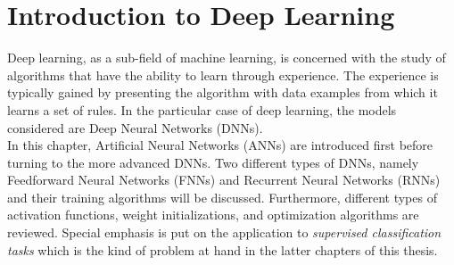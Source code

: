 \chapter{Introduction to Deep Learning}
\label{sec:Deep_learning}
Deep learning, as a sub-field of machine learning, is concerned with the study of algorithms that have the ability to learn through experience. The experience is typically gained by presenting the algorithm with data examples from which it learns a set of rules. In the particular case of deep learning, the models considered are Deep Neural Networks (DNNs). \\
In this chapter, Artificial Neural Networks (ANNs) are introduced first before turning to the more advanced DNNs. Two different types of DNNs, namely Feedforward Neural Networks (FNNs) and Recurrent Neural Networks (RNNs) and their training algorithms will be discussed. Furthermore, different types of activation functions, weight initializations, and optimization algorithms are reviewed. Special emphasis is put on the application to \textit{supervised classification tasks} which is the kind of problem at hand in the latter chapters of this thesis. 

